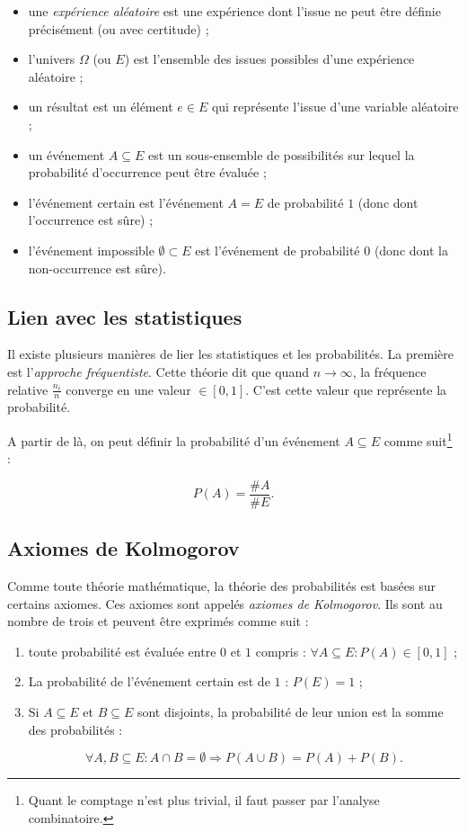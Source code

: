 \documentclass{article}
\begin{document}
		\begin{itemize}
			\item une \textit{expérience aléatoire} est une expérience dont l'issue ne peut être définie précisément (ou avec certitude) ;
			\item l'univers $\Omega$ (ou $E$) est l'ensemble des issues possibles d'une expérience aléatoire ;
			\item un résultat est un élément $e \in E$ qui représente l'issue d'une variable aléatoire ;
			\item un événement $A \subseteq E$ est un sous-ensemble de possibilités sur lequel la probabilité d'occurrence peut être évaluée ;
			\item l'événement certain est l'événement $A = E$ de probabilité $1$ (donc dont l'occurrence est sûre) ;
			\item l'événement impossible $\emptyset \subset E$ est l'événement de probabilité $0$ (donc dont la non-occurrence est sûre).
		\end{itemize}

	\subsection{Lien avec les statistiques}
		Il existe plusieurs manières de lier les statistiques et les probabilités. La première est l'\textit{approche fréquentiste}. Cette théorie dit que quand $n \to \infty$,
		la fréquence relative $\frac {n_i}n$ converge en une valeur $\in [0, 1]$. C'est cette valeur que représente la probabilité.

		A partir de là, on peut définir la probabilité d'un événement $A \subseteq E$ comme suit\footnote{Quant le comptage n'est plus trivial, il faut passer par l'analyse
		combinatoire.} :

		\[P(A) = \frac {\#A}{\#E}.\]

	\subsection{Axiomes de Kolmogorov}
		Comme toute théorie mathématique, la théorie des probabilités est basées sur certains axiomes. Ces axiomes sont appelés \textit{axiomes de Kolmogorov}. Ils sont au nombre
		de trois et peuvent être exprimés comme suit :

		\begin{enumerate}
			\item toute probabilité est évaluée entre $0$ et $1$ compris : $\forall A \subseteq E : P(A) \in [0, 1]$ ;
			\item La probabilité de l'événement certain est de $1$ : $P(E) = 1$ ;
			\item Si $A \subseteq E$ et $B \subseteq E$ sont disjoints, la probabilité de leur union est la somme des probabilités :

				  \[\forall A, B \subseteq E : A \cap B = \emptyset \Rightarrow P(A \cup B) = P(A) + P(B).\]
		\end{enumerate}
\end{document}
